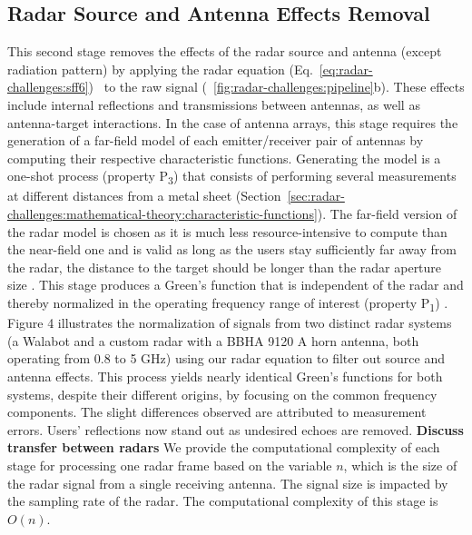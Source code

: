 \subsection{Radar Source and Antenna Effects Removal} \label{sec:radar-challenges:antenna-effects}
This second stage removes the effects of the radar source and antenna (except radiation pattern) by applying the radar equation (Eq.~\ref{eq:radar-challenges:sff6})~\cite{Lambot:2004,Lambot:2014} to the raw signal (\fig~\ref{fig:radar-challenges:pipeline}b). These effects include internal reflections and transmissions between antennas, as well as antenna-target interactions. In the case of antenna arrays, this stage requires the generation of a far-field model of each emitter/receiver pair of antennas by computing their respective characteristic functions. Generating the model is a one-shot process (property P\textsubscript{3}) that consists of performing several measurements at different distances from a metal sheet (Section~\ref{sec:radar-challenges:mathematical-theory:characteristic-functions}). The far-field version of the radar model is chosen as it is much less resource-intensive to compute than the near-field one and is valid as long as the users stay sufficiently far away from the radar, \ie the distance to the target should be longer than the radar aperture size \cite{Tran:2013}. This stage produces a Green's function that is independent of the radar and thereby normalized in the operating frequency range of interest (property P\textsubscript{1}) \cite{DeCoster:2018a}.  Figure 4 illustrates the normalization of signals from two distinct radar systems (a Walabot and a custom radar with a BBHA 9120 A horn antenna, both operating from 0.8 to 5 GHz) using our radar equation to filter out source and antenna effects. This process yields nearly identical Green's functions for both systems, despite their different origins, by focusing on the common frequency components. The slight differences observed are attributed to measurement errors. Users' reflections now stand out as undesired echoes are removed. 
%
\textbf{Discuss transfer between radars}
% 
We provide the computational complexity of each stage for processing one radar frame based on the variable $n$, which is the size of the radar signal from a single receiving antenna. The signal size is impacted by the sampling rate of the radar. 
The computational complexity of this stage is $O(n)$.

